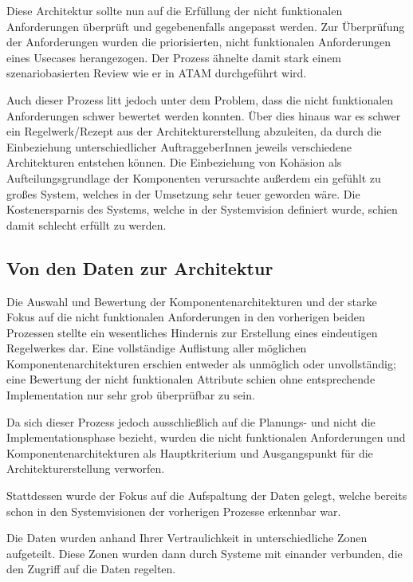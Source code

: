 Diese Architektur sollte nun auf die Erfüllung der nicht funktionalen Anforderungen überprüft und gegebenenfalls angepasst werden. Zur Überprüfung der Anforderungen wurden die priorisierten, nicht funktionalen Anforderungen eines Usecases herangezogen. Der Prozess ähnelte damit stark einem szenariobasierten Review wie er in ATAM durchgeführt wird.

Auch dieser Prozess litt jedoch unter dem Problem, dass die nicht funktionalen Anforderungen schwer bewertet werden konnten. Über dies hinaus war es schwer ein Regelwerk/Rezept aus der Architekturerstellung abzuleiten, da durch die Einbeziehung unterschiedlicher AuftraggeberInnen jeweils verschiedene Architekturen entstehen können. Die Einbeziehung von Kohäsion als Aufteilungsgrundlage der Komponenten verursachte außerdem ein gefühlt zu großes System, welches in der Umsetzung sehr teuer geworden wäre. Die Kostenersparnis des Systems, welche in der Systemvision definiert wurde, schien damit schlecht erfüllt zu werden.

\subsection{Von den Daten zur Architektur}
Die Auswahl und Bewertung der Komponentenarchitekturen und der starke Fokus auf die nicht funktionalen Anforderungen in den vorherigen beiden Prozessen stellte ein wesentliches Hindernis zur Erstellung eines eindeutigen Regelwerkes dar. Eine vollständige Auflistung aller möglichen Komponentenarchitekturen erschien entweder als unmöglich oder unvollständig; eine Bewertung der nicht funktionalen Attribute schien ohne entsprechende Implementation nur sehr grob überprüfbar zu sein.

Da sich dieser Prozess jedoch ausschließlich auf die Planungs- und nicht die Implementationsphase bezieht, wurden die nicht funktionalen Anforderungen und Komponentenarchitekturen als Hauptkriterium und Ausgangspunkt für die Architekturerstellung verworfen.

Stattdessen wurde der Fokus auf die Aufspaltung der Daten gelegt, welche bereits schon in den Systemvisionen der vorherigen Prozesse erkennbar war.

Die Daten wurden anhand Ihrer Vertraulichkeit in unterschiedliche Zonen aufgeteilt. Diese Zonen wurden dann durch Systeme mit einander verbunden, die den Zugriff auf die Daten regelten.

